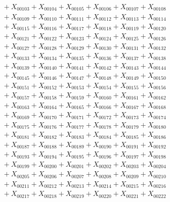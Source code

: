 \documentclass[a4paper,10pt]{article}
\begin{document}
{\begin{align}
&\quad  + X_{00103} + X_{00104} + X_{00105} + X_{00106} + X_{00107} + X_{00108} \\[0.5ex]
&\quad  + X_{00109} + X_{00110} + X_{00111} + X_{00112} + X_{00113} + X_{00114} \\[0.5ex]
&\quad  + X_{00115} + X_{00116} + X_{00117} + X_{00118} + X_{00119} + X_{00120} \\[0.5ex]
&\quad  + X_{00121} + X_{00122} + X_{00123} + X_{00124} + X_{00125} + X_{00126} \\[0.5ex]
&\quad  + X_{00127} + X_{00128} + X_{00129} + X_{00130} + X_{00131} + X_{00132} \\[0.5ex]
&\quad  + X_{00133} + X_{00134} + X_{00135} + X_{00136} + X_{00137} + X_{00138} \\[0.5ex]
&\quad  + X_{00139} + X_{00140} + X_{00141} + X_{00142} + X_{00143} + X_{00144} \\[0.5ex]
&\quad  + X_{00145} + X_{00146} + X_{00147} + X_{00148} + X_{00149} + X_{00150} \\[0.5ex]
&\quad  + X_{00151} + X_{00152} + X_{00153} + X_{00154} + X_{00155} + X_{00156} \\[0.5ex]
&\quad  + X_{00157} + X_{00158} + X_{00159} + X_{00160} + X_{00161} + X_{00162} \\[0.5ex]
&\quad  + X_{00163} + X_{00164} + X_{00165} + X_{00166} + X_{00167} + X_{00168} \\[0.5ex]
&\quad  + X_{00169} + X_{00170} + X_{00171} + X_{00172} + X_{00173} + X_{00174} \\[0.5ex]
&\quad  + X_{00175} + X_{00176} + X_{00177} + X_{00178} + X_{00179} + X_{00180} \\[0.5ex]
&\quad  + X_{00181} + X_{00182} + X_{00183} + X_{00184} + X_{00185} + X_{00186} \\[0.5ex]
&\quad  + X_{00187} + X_{00188} + X_{00189} + X_{00190} + X_{00191} + X_{00192} \\[0.5ex]
&\quad  + X_{00193} + X_{00194} + X_{00195} + X_{00196} + X_{00197} + X_{00198} \\[0.5ex]
&\quad  + X_{00199} + X_{00200} + X_{00201} + X_{00202} + X_{00203} + X_{00204} \\[0.5ex]
&\quad  + X_{00205} + X_{00206} + X_{00207} + X_{00208} + X_{00209} + X_{00210} \\[0.5ex]
&\quad  + X_{00211} + X_{00212} + X_{00213} + X_{00214} + X_{00215} + X_{00216} \\[0.5ex]
&\quad  + X_{00217} + X_{00218} + X_{00219} + X_{00220} + X_{00221} + X_{00222} \\[0.5ex]

\end{align}}
\end{document}
